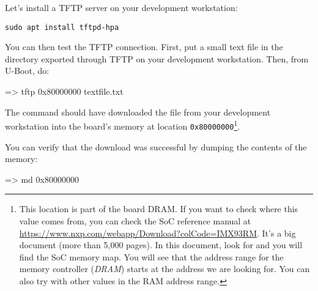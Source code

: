 Let's install a TFTP server on your development workstation:

\begin{verbatim}
sudo apt install tftpd-hpa
\end{verbatim}

You can then test the TFTP connection. First, put a small text file in
the directory exported through TFTP on your development
workstation. Then, from U-Boot, do:

\begin{ubootinput}
=> tftp 0x80000000 textfile.txt
\end{ubootinput}

The  command should have downloaded the
 file from your development workstation into
the board's memory at location {\tt 0x80000000}\footnote{
This location is part of the board DRAM. If you want
to check where this value comes from, you can check the SoC
reference manual at
\url{https://www.nxp.com/webapp/Download?colCode=IMX93RM}.
It's a big document (more than 5,000 pages). In this document, look
for  and you will find the SoC memory map.
You will see that the address range for the memory controller
({\em DRAM})
starts at the address we are looking for.
You can also try with other values in the RAM address range.}.

You can verify that the download was successful by dumping the
contents of the memory:

\begin{ubootinput}
=> md 0x80000000
\end{ubootinput}

